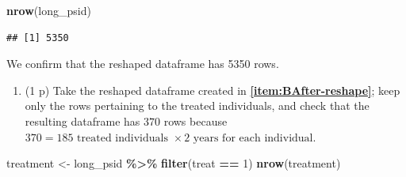 \documentclass[
]{article}
\newenvironment{Shaded}{\begin{snugshade}}{\end{snugshade}}
\newcommand{\DecValTok}[1]{\textcolor[rgb]{0.00,0.00,0.81}{#1}}
\newcommand{\FunctionTok}[1]{\textcolor[rgb]{0.13,0.29,0.53}{\textbf{#1}}}
\newcommand{\NormalTok}[1]{#1}
\newcommand{\OtherTok}[1]{\textcolor[rgb]{0.56,0.35,0.01}{#1}}
\newcommand{\SpecialCharTok}[1]{\textcolor[rgb]{0.81,0.36,0.00}{\textbf{#1}}}
\newcommand{\StringTok}[1]{\textcolor[rgb]{0.31,0.60,0.02}{#1}}
\providecommand{\tightlist}{%
  \setlength{\itemsep}{0pt}\setlength{\parskip}{0pt}}
\begin{document}
\begin{Shaded}
\end{Shaded}

\begin{Shaded}
\begin{Highlighting}[]
\FunctionTok{nrow}\NormalTok{(long\_psid)}
\end{Highlighting}
\end{Shaded}

\begin{verbatim}
## [1] 5350
\end{verbatim}

We confirm that the reshaped dataframe has 5350 rows.

\begin{enumerate}
\def\labelenumi{\alph{enumi}.}
\setcounter{enumi}{1}
\tightlist
\item
  (1 p) Take the reshaped dataframe created in
  \textbf{\ref{item:BAfter-reshape}}; keep only the rows pertaining to
  the treated individuals, and check that the resulting dataframe has
  \(370\) rows because
  \(370=185 \text{ treated individuals } \times 2 \text{ years for each individual}\).\label{item:BAfter-filter}
\end{enumerate}

\begin{Shaded}
\begin{Highlighting}[]
\NormalTok{treatment }\OtherTok{\textless{}{-}}\NormalTok{ long\_psid }\SpecialCharTok{\%\textgreater{}\%} \FunctionTok{filter}\NormalTok{(treat }\SpecialCharTok{==} \DecValTok{1}\NormalTok{)}
\FunctionTok{nrow}\NormalTok{(treatment)}
\end{Highlighting}
\end{Shaded}
\end{document}
